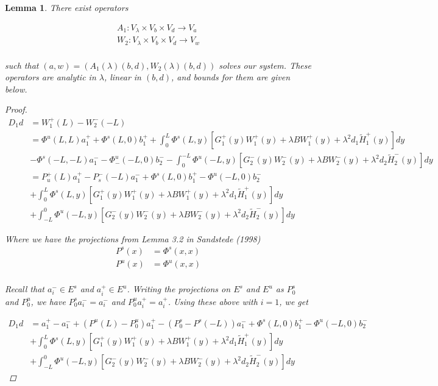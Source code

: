 \documentclass[12pt]{article}
\newtheorem{lemma}{Lemma}
\begin{document}
\begin{lemma}
There exist operators

\begin{align*}
A_1: V_\lambda \times V_b \times V_d \rightarrow V_a \\
W_2: V_\lambda \times V_b \times V_d \rightarrow V_w \\
\end{align*}

such that $(a,w) = ( A_1(\lambda)(b,d), W_2(\lambda)(b,d) )$ solves our system. These operators are analytic in $\lambda$, linear in $(b,d)$, and bounds for them are given below.

\begin{proof}
\begin{align*}
D_1 d &= W_1^+(L) - W_2^-(-L) \\
&= \Phi^u(L, L)a^+_{1} + \Phi^s(L, 0)b_1^+ 
+ \int_0^L \Phi^s(L, y)[G_1^+(y) W_1^+(y) + \lambda B W_1^+(y) + \lambda^2 d_1 \tilde{H}_1^+(y) ] dy \\  
&- \Phi^s(-L, -L)a^-_{1} - \Phi^u_-(-L, 0)b_2^- - \int_0^{-L} \Phi^u(-L, y)[G_2^-(y) W_2^-(y) + \lambda B W_2^-(y) + \lambda^2 d_2 \tilde{H}_2^-(y) ] dy \\
&= P_u^+(L) a^+_{1} - P_s^-(-L) a^-_{1} + \Phi^s(L, 0)b_1^+ - \Phi^u(-L, 0)b_2^- \\
&+ \int_0^L \Phi^s(L, y)[G_1^+(y) W_1^+(y) + \lambda B W_1^+(y) + \lambda^2 d_1 \tilde{H}_1^+(y) ] dy \\
&+ \int_{-L}^0 \Phi^u(-L, y)[G_2^-(y) W_2^-(y) + \lambda B W_2^-(y) + \lambda^2 d_2 \tilde{H}_2^-(y) ] dy 
\end{align*}

Where we have the projections from Lemma 3.2 in Sandstede (1998)
\begin{align*}
P^s(x) &= \Phi^s(x,x) \\
P^u(x) &= \Phi^u(x,x) \\
\end{align*}

Recall that $a_i^- \in E^s$ and $a_i^+ \in E^u$. Writing the projections on $E^s$ and $E^u$ as $P_0^s$ and $P_0^u$, we have $P_0^s a_i^- = a_i^-$ and $P_0^u a_i^+ = a_i^+$. Using these above with $i = 1$, we get 

\begin{align*}
D_1 d &=  a^+_1 - a^-_1 + (P^u(L) - P_0^u) a^+_1 - (P_0^s - P^s(-L)) a^-_1 + \Phi^s(L, 0)b_1^+ - \Phi^u(-L, 0)b_2^- \\
&+ \int_0^L \Phi^s(L, y)[G_1^+(y) W_1^+(y) + \lambda B W_1^+(y) + \lambda^2 d_1 \tilde{H}_1^+(y) ] dy \\
&+ \int_{-L}^0 \Phi^u(-L, y)[G_2^-(y) W_2^-(y) + \lambda B W_2^-(y) + \lambda^2 d_2 \tilde{H}_2^-(y) ] dy 
\end{align*}


\end{proof}
\end{lemma}
\end{document}
